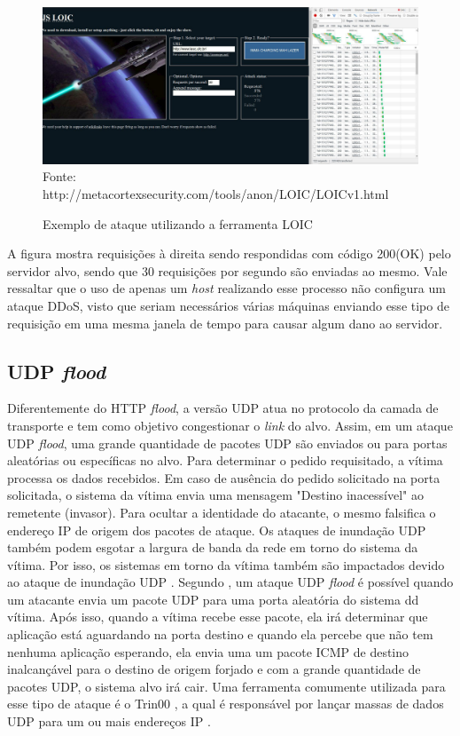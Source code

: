  \begin{figure}[ht]
 	\centering
 	\caption{Exemplo de ataque utilizando a ferramenta LOIC }
 	\includegraphics[width=1\textwidth]{figs/loic.pdf}\\
 	{Fonte: http://metacortexsecurity.com/tools/anon/LOIC/LOICv1.html}
 	\label{fig:loic}
 \end{figure} 
 
 A figura mostra requisições à direita sendo respondidas com código 200(OK) pelo servidor alvo, sendo que 30 requisições por segundo são enviadas ao mesmo. Vale ressaltar que o uso de apenas um \textit{host} realizando  esse processo não configura um ataque DDoS, visto que seriam necessários várias máquinas enviando esse tipo de requisição em uma mesma janela de tempo para causar algum dano ao servidor.
 
 \subsection{UDP \textit{flood}}
 
 Diferentemente do HTTP \textit{flood}, a versão UDP atua no protocolo da camada de transporte e tem como objetivo congestionar o \textit{link} do alvo. Assim, em um ataque UDP \textit{flood}, uma grande quantidade de pacotes UDP são enviados ou para portas aleatórias ou específicas no alvo. Para determinar o pedido requisitado, a vítima processa os dados recebidos. Em caso de ausência do pedido solicitado na porta solicitada, o sistema da vítima envia uma mensagem "Destino inacessível" ao remetente (invasor). Para ocultar a identidade do atacante, o mesmo falsifica o endereço IP de origem dos pacotes de ataque. Os ataques de inundação UDP também podem esgotar a largura de banda da rede em torno do sistema da vítima. Por isso, os sistemas em torno da vítima também são impactados devido ao ataque de inundação UDP \cite{xiaoming2010denial}. Segundo \cite{ddosatacks}, um ataque UDP \textit{flood} é possível quando um atacante envia um pacote UDP para uma porta aleatória do sistema dd vítima. Após isso, quando a vítima recebe esse pacote, ela irá determinar que aplicação está aguardando na porta destino e quando ela percebe que não tem nenhuma aplicação esperando, ela envia uma um pacote ICMP de destino inalcançável para o destino de origem forjado e com a grande quantidade de pacotes UDP, o sistema alvo irá cair. Uma ferramenta comumente utilizada para esse tipo de ataque é o Trin00 \cite{criscuolo2000distributed}, a qual é responsável por lançar massas de dados UDP para um ou mais endereços IP \cite{dittrich2002projectos}.
 
